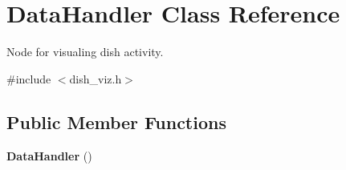 \section{\-Data\-Handler \-Class \-Reference}
\label{classDataHandler}


\-Node for visualing dish activity.  




{\ttfamily \#include $<$dish\-\_\-viz.\-h$>$}

\subsection*{\-Public \-Member \-Functions}
\begin{DoxyCompactItemize}
\item 
{\bf \-Data\-Handler} ()
\end{DoxyCompactItemize}

